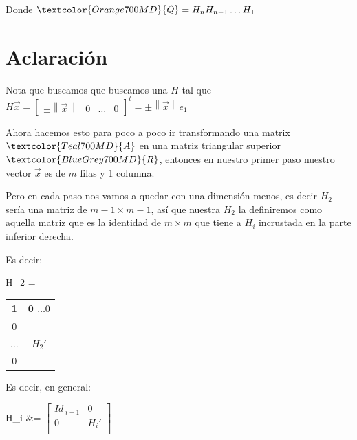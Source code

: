 \documentclass[12pt, fleqn]{report}                             %
\def \Eq {equation}                                             %
\newenvironment{MultiLineEquation*}[1]                          %
        {\begin{\Eq*}\begin{alignedat}{#1}}                         %
        {\end{alignedat}\end{\Eq*}}                                 %
\theoremstyle{break}                                            %
\newcommand{\Abs}[1]    {\left\lVert #1 \right\lVert}           %
\newcommand{\bVector}[1]                                        %
        { \ensuremath{\begin{bmatrix}#1\end{bmatrix}} }             %
\newcommand{\Color}[2]{\textcolor{#1}{#2}}                      %
\newcommand \ColorMatrixA       {Teal700MD}                     %
\newcommand \ColorMatrixQ       {Orange700MD}                   %
\newcommand \ColorMatrixR       {BlueGrey700MD}                 %
\newcommand \MatrixA      {\Color{\ColorMatrixA}{A}}            %
\newcommand \MatrixQ      {\Color{\ColorMatrixQ}{Q}}            %
\newcommand \MatrixR      {\Color{\ColorMatrixR}{R}}            %
\begin{document}
            Donde $\MatrixQ = H_n H_{n-1} \dots H_1$
            
        
        \clearpage
        \section{Aclaración}

            Nota que buscamos que buscamos una $H$ tal que 
            $H \vec x = \bVector{\pm \Abs{\vec x} & 0 & \dots & 0}^t = \pm \Abs{\vec x} e_1$
            
            Ahora hacemos esto para poco a poco ir transformando una matrix $\MatrixA$
            en una matriz triangular superior $\MatrixR$, entonces en nuestro primer paso
            nuestro vector $\vec x$ es de $m$ filas y 1 columna.
            
            Pero en cada paso nos vamos a quedar con una dimensión menos, es decir
            $H_2$ sería una matriz de $m-1 \times m-1$, así que nuestra $H_2$ la
            definiremos como aquella matriz que es la identidad de $m \times m$ que tiene
            a $H_i$ incrustada en la parte inferior derecha.

            Es decir:
            \begin{MultiLineEquation*}{3}
                H_2 = \begin{tabular}{ |c |c| }
                    1 & 0 $\dots 0$ \\
                    \hline
                    0   &\\
                    $\dots$ & $H_2'$  \\
                    0   &\\
                \end{tabular}
            \end{MultiLineEquation*}

            Es decir, en general:
            \begin{MultiLineEquation*}{3}
                H_i 
                    &= \bVector{
                        Id_{\; i - 1} & 0 \\
                        0 & H_i' \\
                    }
            \end{MultiLineEquation*}
            

        \clearpage
\end{document}
